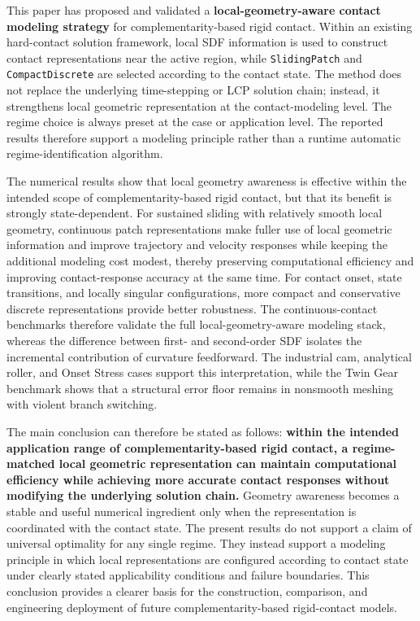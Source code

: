 This paper has proposed and validated a \textbf{local-geometry-aware contact modeling strategy} for complementarity-based rigid contact. Within an existing hard-contact solution framework, local SDF information is used to construct contact representations near the active region, while \texttt{SlidingPatch} and \texttt{CompactDiscrete} are selected according to the contact state. The method does not replace the underlying time-stepping or LCP solution chain; instead, it strengthens local geometric representation at the contact-modeling level. The regime choice is always preset at the case or application level. The reported results therefore support a modeling principle rather than a runtime automatic regime-identification algorithm.

The numerical results show that local geometry awareness is effective within the intended scope of complementarity-based rigid contact, but that its benefit is strongly state-dependent. For sustained sliding with relatively smooth local geometry, continuous patch representations make fuller use of local geometric information and improve trajectory and velocity responses while keeping the additional modeling cost modest, thereby preserving computational efficiency and improving contact-response accuracy at the same time. For contact onset, state transitions, and locally singular configurations, more compact and conservative discrete representations provide better robustness. The continuous-contact benchmarks therefore validate the full local-geometry-aware modeling stack, whereas the difference between first- and second-order SDF isolates the incremental contribution of curvature feedforward. The industrial cam, analytical roller, and Onset Stress cases support this interpretation, while the Twin Gear benchmark shows that a structural error floor remains in nonsmooth meshing with violent branch switching.

The main conclusion can therefore be stated as follows: \textbf{within the intended application range of complementarity-based rigid contact, a regime-matched local geometric representation can maintain computational efficiency while achieving more accurate contact responses without modifying the underlying solution chain.} Geometry awareness becomes a stable and useful numerical ingredient only when the representation is coordinated with the contact state. The present results do not support a claim of universal optimality for any single regime. They instead support a modeling principle in which local representations are configured according to contact state under clearly stated applicability conditions and failure boundaries. This conclusion provides a clearer basis for the construction, comparison, and engineering deployment of future complementarity-based rigid-contact models.

